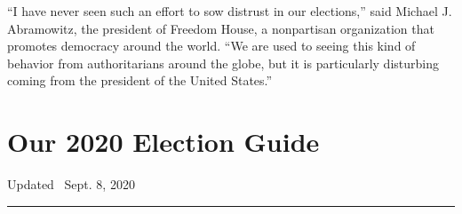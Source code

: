 ``I have never seen such an effort to sow distrust in our elections,''
said Michael J. Abramowitz, the president of Freedom House, a
nonpartisan organization that promotes democracy around the world. ``We
are used to seeing this kind of behavior from authoritarians around the
globe, but it is particularly disturbing coming from the president of
the United States.''

\hypertarget{our-2020-election-guide}{%
\section{Our 2020 Election Guide}\label{our-2020-election-guide}}

Updated ~Sept. 8, 2020

\begin{center}\rule{0.5\linewidth}{\linethickness}\end{center}

